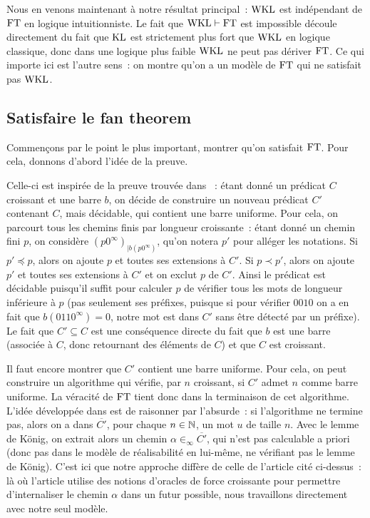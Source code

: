 \documentclass{article}
\begin{document}
Nous en venons maintenant à notre résultat principal~: $\mathrm{WKL}$ est indépendant de $\mathrm{FT}$ en logique intuitionniste. Le fait que $\mathrm{WKL}\vdash \mathrm{FT}$ est impossible découle directement du fait que $\mathrm{KL}$ est strictement plus fort que $\mathrm{WKL}$ en logique classique, donc dans une logique plus faible $\mathrm{WKL}$ ne peut pas dériver $\mathrm{FT}$. Ce qui importe ici est l'autre sens~: on montre qu'on a un modèle de $\mathrm{FT}$ qui ne satisfait pas $\mathrm{WKL}$.

\subsection{Satisfaire le fan theorem}

Commençons par le point le plus important, montrer qu'on satisfait $\mathrm{FT}$. Pour cela, donnons d'abord l'idée de la preuve.

Celle-ci est inspirée de la preuve trouvée dans \cite{lubarsky2015realizabilitymodelsseparatingvarious}~: étant donné un prédicat $C$ croissant et une barre $b$, on décide de construire un nouveau prédicat $C'$ contenant $C$, mais décidable, qui contient une barre uniforme. Pour cela, on parcourt tous les chemins finis par longueur croissante~: étant donné un chemin fini $p$, on considère $(p 0^\infty)_{|b(p0^\infty)}$, qu'on notera $p'$ pour alléger les notations. Si $p'\preceq p$, alors on ajoute $p$ et toutes ses extensions à $C'$. Si $p\prec p'$, alors on ajoute $p'$ et toutes ses extensions à $C'$ et on exclut $p$ de $C'$. Ainsi le prédicat est décidable puisqu'il suffit pour calculer $p$ de vérifier tous les mots de longueur inférieure à $p$ (pas seulement ses préfixes, puisque si pour vérifier $0010$ on a en fait que $b(0110^\infty) = 0$, notre mot est dans $C'$ sans être détecté par un préfixe). Le fait que $C'\subseteq C$ est une conséquence directe du fait que $b$ est une barre (associée à $C$, donc retournant des éléments de $C$) et que $C$ est croissant.

Il faut encore montrer que $C'$ contient une barre uniforme. Pour cela, on peut construire un algorithme qui vérifie, par $n$ croissant, si $C'$ admet $n$ comme barre uniforme. La véracité de $\mathrm{FT}$ tient donc dans la terminaison de cet algorithme. L'idée développée dans \cite{lubarsky2015realizabilitymodelsseparatingvarious} est de raisonner par l'absurde~: si l'algorithme ne termine pas, alors on a dans $\overline{C'}$, pour chaque $n \in \mathbb{N}$, un mot $u$ de taille $n$. Avec le lemme de König, on extrait alors un chemin $\alpha \in_\infty \overline{C'}$, qui n'est pas calculable a priori (donc pas dans le modèle de réalisabilité en lui-même, ne vérifiant pas le lemme de König). C'est ici que notre approche diffère de celle de l'article cité ci-dessus~: là où l'article utilise des notions d'oracles de force croissante pour permettre d'internaliser le chemin $\alpha$ dans un futur possible, nous travaillons directement avec notre seul modèle.
\end{document}
